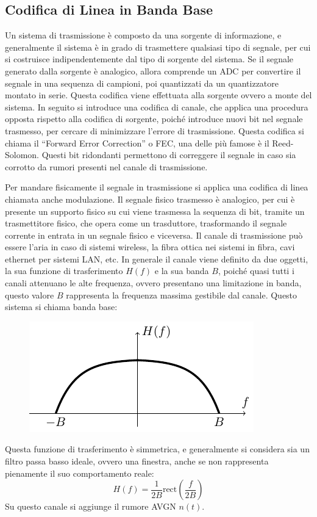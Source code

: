 \documentclass{article}
\newcommand{\rect}{\mathrm{rect}}
\numberwithin{equation}{subsection}
\begin{document}
\subsection{Codifica di Linea in Banda Base}

Un sistema di trasmissione è composto da una sorgente di informazione, e generalmente il sistema è in grado di trasmettere qualsiasi tipo di segnale, per cui si costruisce 
indipendentemente dal tipo di sorgente del sistema. Se il segnale generato dalla sorgente è analogico, allora comprende un ADC per convertire il segnale in una sequenza 
di campioni, poi quantizzati da un quantizzatore montato in serie. 
Questa codifica viene effettuata alla sorgente ovvero a monte del sistema. 
In seguito si introduce una codifica di canale, che applica una procedura opposta rispetto alla codifica di sorgente, poiché introduce nuovi bit nel segnale trasmesso, 
per cercare di minimizzare l'errore di trasmissione. Questa codifica si chiama il ``Forward Error Correction'' o FEC, una delle più famose è il Reed-Solomon. 
Questi bit ridondanti permettono di correggere il segnale in caso sia corrotto da rumori presenti nel canale di trasmissione.  

Per mandare fisicamente il segnale in trasmissione si applica una codifica di linea chiamata anche modulazione. 
Il segnale fisico trasmesso è analogico, per cui è presente un supporto fisico su cui viene trasmessa la sequenza di bit, tramite un trasmettitore fisico, che opera come un 
trasduttore, trasformando il segnale corrente in entrata in un segnale fisico e viceversa. 
Il canale di trasmissione può essere l'aria in caso di sistemi wireless, la fibra ottica nei sistemi in fibra, cavi ethernet per sistemi LAN, 
etc. In generale il canale viene definito da due oggetti, la sua funzione di trasferimento $H(f)$ e la sua banda $B$, poiché quasi tutti i canali attenuano le alte frequenza, ovvero presentano 
una limitazione in banda, questo valore $B$ rappresenta la frequenza massima gestibile dal canale. Questo sistema si chiama banda base:
\begin{figure}[H]%
    \centering
    \includegraphics{funzione-canale.pdf}%
\end{figure}
Questa funzione di trasferimento è simmetrica, e generalmente si considera sia un filtro passa basso ideale, ovvero una finestra, anche se non rappresenta pienamente il 
suo comportamento reale:
\begin{equation*}
    H(f)=\displaystyle\frac{1}{2B}\rect\left(\frac{f}{2B}\right)
\end{equation*}
Su questo canale si aggiunge il rumore AVGN $n(t)$. 
\end{document}
